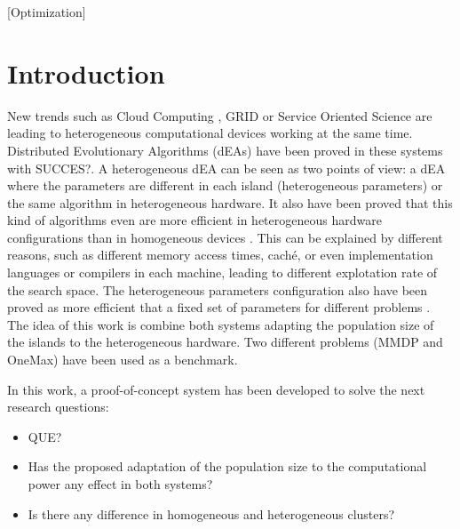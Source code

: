 \documentclass{sig-alternate}
\begin{document}
[Optimization]






%
%
\section{Introduction}
\label{sec:intro}
%
New trends such as Cloud Computing \cite{CLOUD}, GRID \cite{GRID} or Service Oriented Science are leading to heterogeneous computational devices working at the same time. Distributed Evolutionary Algorithms (dEAs) have been proved in these systems with SUCCES?. A heterogeneous dEA can be seen as two points of view: a dEA where the parameters are different in each island (heterogeneous parameters) or the same algorithm in heterogeneous hardware. It also have been proved that this kind of algorithms even are more efficient in heterogeneous hardware configurations than in homogeneous devices \cite{HETEROGENEOUSHARD}. This can be explained by different reasons, such as different memory access times, caché, or even implementation languages or compilers in each machine, leading to different explotation rate of the search space. The heterogeneous parameters configuration also have been proved as more efficient that a fixed set of parameters for different problems \cite{HETEROGENEOUS}. The idea of this work is combine both systems adapting the population size of the islands to the heterogeneous hardware. Two different problems (MMDP and OneMax) have been used as a benchmark.



In this work, a proof-of-concept system has been developed to solve the next research questions:
\begin{itemize}
 \item QUE?
 \item Has the proposed adaptation of the population size to the computational power any effect in both systems?
 \item Is there any difference in homogeneous and heterogeneous clusters?
\end{itemize}
\end{document}
